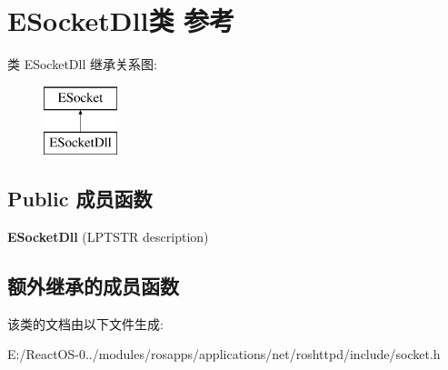 \hypertarget{class_e_socket_dll}{}\section{E\+Socket\+Dll类 参考}
\label{class_e_socket_dll}
类 E\+Socket\+Dll 继承关系图\+:\begin{figure}[H]
\begin{center}
\leavevmode
\includegraphics[height=2.000000cm]{class_e_socket_dll}
\end{center}
\end{figure}
\subsection*{Public 成员函数}
\begin{DoxyCompactItemize}
\item 
\mbox{\label{class_e_socket_dll_a505c81414e9df906afb6787f9be2ddb7}} 
{\bfseries E\+Socket\+Dll} (L\+P\+T\+S\+TR description)
\end{DoxyCompactItemize}
\subsection*{额外继承的成员函数}


该类的文档由以下文件生成\+:\begin{DoxyCompactItemize}
\item 
E\+:/\+React\+O\+S-\/0../modules/rosapps/applications/net/roshttpd/include/socket.\+h\end{DoxyCompactItemize}
